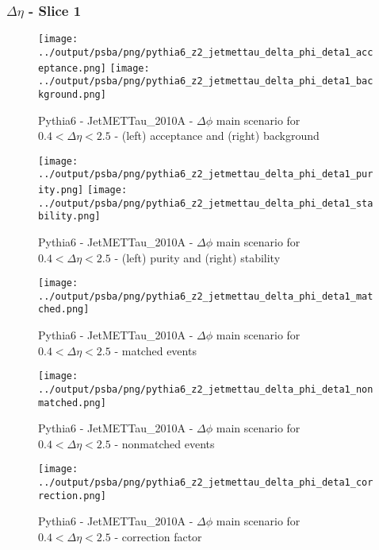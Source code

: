\documentclass[11pt]{book}
\begin{document}
\subsubsection{$\Delta\eta$ - Slice 1}
\begin{figure}[ht]
\centering
\texttt{[image: ../output/psba/png/pythia6\_z2\_jetmettau\_delta\_phi\_deta1\_acceptance.png]}
\texttt{[image: ../output/psba/png/pythia6\_z2\_jetmettau\_delta\_phi\_deta1\_background.png]}
\caption{Pythia6 - JetMETTau\_2010A - $\Delta\phi$ main scenario for $0.4 < \Delta\eta < 2.5$ - (left) acceptance and (right) background}
\label{fig:p6_jetmettau_delta_phi_deta1_ab}
\end{figure}

\begin{figure}[ht]
\centering
\texttt{[image: ../output/psba/png/pythia6\_z2\_jetmettau\_delta\_phi\_deta1\_purity.png]}
\texttt{[image: ../output/psba/png/pythia6\_z2\_jetmettau\_delta\_phi\_deta1\_stability.png]}
\caption{Pythia6 - JetMETTau\_2010A - $\Delta\phi$ main scenario for $0.4 < \Delta\eta < 2.5$ - (left) purity and (right) stability}
\label{fig:p6_jetmettau_delta_phi_deta1_ps}
\end{figure}

\begin{figure}[ht]
\centering
\texttt{[image: ../output/psba/png/pythia6\_z2\_jetmettau\_delta\_phi\_deta1\_matched.png]}
\caption{Pythia6 - JetMETTau\_2010A - $\Delta\phi$ main scenario for $0.4 < \Delta\eta < 2.5$ - matched events}
\label{fig:p6_jetmettau_delta_phi_deta1_matched}
\end{figure}

\begin{figure}[ht]
\centering
\texttt{[image: ../output/psba/png/pythia6\_z2\_jetmettau\_delta\_phi\_deta1\_nonmatched.png]}
\caption{Pythia6 - JetMETTau\_2010A - $\Delta\phi$ main scenario for $0.4 < \Delta\eta < 2.5$ - nonmatched events}
\label{fig:p6_jetmettau_delta_phi_deta1_nonmatched}
\end{figure}

\begin{figure}[ht]
\centering
\texttt{[image: ../output/psba/png/pythia6\_z2\_jetmettau\_delta\_phi\_deta1\_correction.png]}
\caption{Pythia6 - JetMETTau\_2010A - $\Delta\phi$ main scenario for $0.4 < \Delta\eta < 2.5$ - correction factor}
\label{fig:p6_jetmettau_delta_phi_deta1_correction}
\end{figure}
\end{document}

